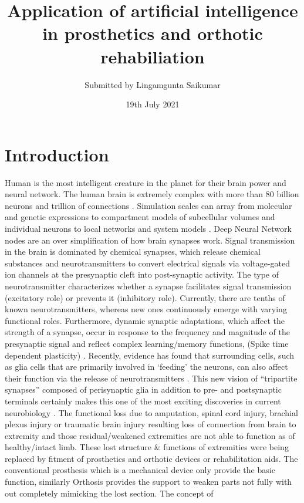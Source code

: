 \documentclass{article}
\title{Application of artificial intelligence in prosthetics and orthotic rehabiliation}
\author{Submitted by Lingamgunta Saikumar}
\date{19th July 2021}
\begin{document}
\maketitle

\section{Introduction}
Human is the most intelligent creature in the planet for their brain power 
and neural network. The human brain is extremely complex with more 
than 80 billion neurons and trillion of connections . Simulation scales can 
array from molecular and genetic expressions to compartment models of 
subcellular volumes and individual neurons to local networks and system 
models . Deep Neural Network nodes are an over simplification of how 
brain synapses work. Signal transmission in the brain is dominated by 
chemical synapses, which release chemical substances and 
neurotransmitters to convert electrical signals via voltage-gated ion 
channels at the presynaptic cleft into post-synaptic activity. The type of 
neurotransmitter characterizes whether a synapse facilitates signal 
transmission (excitatory role) or prevents it (inhibitory role). Currently, 
there are tenths of known neurotransmitters, whereas new ones 
continuously emerge with varying functional roles. Furthermore, dynamic 
synaptic adaptations, which affect the strength of a synapse, occur in 
response to the frequency and magnitude of the presynaptic signal and 
reflect complex learning/memory functions, (Spike time dependent 
plasticity) . Recently, evidence has found that surrounding cells, such as glia 
cells that are primarily involved in ‘feeding’ the neurons, can also affect 
their function via the release of neurotransmitters .
This new vision of “tripartite synapses” composed of perisynaptic glia in 
addition to pre- and postsynaptic terminals certainly makes this one of the 
most exciting discoveries in current neurobiology . The functional loss due 
to amputation, spinal cord injury, brachial plexus injury or traumatic brain 
injury resulting loss of connection from brain to extremity and those 
residual/weakened extremities are not able to function as of healthy/intact 
limb. These lost structure & functions of extremities were being replaced 
by fitment of prosthetics and orthotic devices or rehabilitation aids. The 
conventional prosthesis which is a mechanical device only provide the basic 
function, similarly Orthosis provides the support to weaken parts not fully 
with out completely mimicking the lost section. The concept of 
\end{document}
